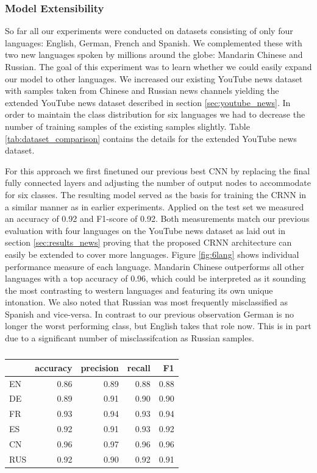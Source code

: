 \subsubsection{Model Extensibility} 
\label{sec:extensibility}
So far all our experiments were conducted on datasets consisting of only four languages: English, German, French and Spanish. We complemented these with two new languages spoken by millions around the globe: Mandarin Chinese and Russian. The goal of this experiment was to learn whether we could easily expand our model to other languages. 
We increased our existing YouTube news dataset with samples taken from Chinese and Russian news channels yielding the extended YouTube news dataset described in section \ref{sec:youtube_news}. In order to maintain the class distribution for six languages we had to decrease the number of training samples of the existing samples slightly. Table \ref{tab:dataset_comparison} contains the details for the extended YouTube news dataset.

For this approach we first finetuned our previous best CNN by replacing the final fully connected layers and adjusting the number of output nodes to accommodate for six classes. The resulting model served as the basis for training the CRNN in a similar manner as in earlier experiments. Applied on the test set we measured an accuracy of 0.92 and F1-score of 0.92. Both measurements match our previous evaluation with four languages on the YouTube news dataset as laid out in section \ref{sec:results_news} proving that the proposed CRNN architecture can easily be extended to cover more languages. Figure \ref{fig:6lang} shows individual performance measure of each language. Mandarin Chinese outperforms all other languages with a top accuracy of 0.96, which could be interpreted as it sounding the most contrasting to western languages and featuring its own unique intonation. We also noted that Russian was most frequently misclassified as Spanish and vice-versa. In contrast to our previous observation German is no longer the worst performing class, but English takes that role now. This is in part due to a significant number of misclassifcation as Russian samples.

	\begin{table}[]
	\centering
	\begin{tabularx}{\textwidth}{lrrrr}
	\toprule
     & accuracy & precision & recall  & F1 \\ \midrule
EN   & 0.86     & 0.89      & 0.88    & 0.88 \\
DE   & 0.89     & 0.91      & 0.90    & 0.90 \\
FR   & 0.93     & 0.94      & 0.93    & 0.94 \\
ES   & 0.92     & 0.91      & 0.93    & 0.92 \\
CN   & 0.96     & 0.97      & 0.96    & 0.96 \\
RUS  & 0.92     & 0.90      & 0.92    & 0.91 \\

 	\bottomrule
	\end{tabularx}
	\caption{}
	\label{tab:6lang}
	\end{table}


